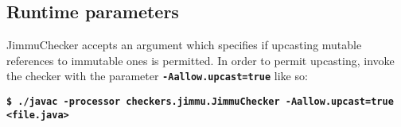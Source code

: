 \documentclass{pracamgr}
\theoremstyle{break}
\theoremstyle{break}
\theoremstyle{break}
\begin{document}
\subsection{Runtime parameters}

JimmuChecker accepts an argument which specifies if upcasting mutable
references to immutable ones is permitted. In order to permit
upcasting, invoke the checker with the parameter
\textbf{\texttt{-Aallow.upcast=true}} like so:

\indent \textbf{\texttt{\small{\$ ./javac -processor checkers.jimmu.JimmuChecker -Aallow.upcast=true <file.java>}}}

{}

\end{document}
